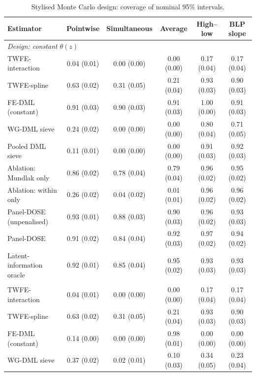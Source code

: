 \documentclass[preprint,12pt,authoryear]{elsarticle}
\begin{document}
\begin{table}[!ht]
\centering
\begin{threeparttable}
\caption{Stylised Monte Carlo design: coverage of nominal 95\% intervals.}\label{tab:simcover}
\scriptsize
\begin{tabular}{lccccc}
\toprule
Estimator & Pointwise & Simultaneous & Average & High--low & BLP slope\\
\midrule
\multicolumn{6}{l}{\textit{Design: constant $\theta(z)$}}\\
\quad TWFE-interaction & 0.04 (0.01) & 0.00 (0.00) & 0.00 (0.00) & 0.17 (0.04) & 0.17 (0.04)\\
\quad TWFE-spline & 0.63 (0.02) & 0.31 (0.05) & 0.21 (0.04) & 0.93 (0.03) & 0.90 (0.03)\\
\quad FE-DML (constant) & 0.91 (0.03) & 0.90 (0.03) & 0.91 (0.03) & 1.00 (0.00) & 0.91 (0.03)\\
\quad WG-DML sieve & 0.24 (0.02) & 0.00 (0.00) & 0.00 (0.00) & 0.80 (0.04) & 0.71 (0.05)\\
\quad Pooled DML sieve & 0.11 (0.01) & 0.00 (0.00) & 0.00 (0.00) & 0.91 (0.03) & 0.92 (0.03)\\
\quad Ablation: Mundlak only & 0.86 (0.02) & 0.78 (0.04) & 0.79 (0.04) & 0.96 (0.02) & 0.95 (0.02)\\
\quad Ablation: within only & 0.26 (0.02) & 0.04 (0.02) & 0.01 (0.01) & 0.96 (0.02) & 0.96 (0.02)\\
\quad Panel-DOSE (unpenalised) & 0.93 (0.01) & 0.88 (0.03) & 0.90 (0.03) & 0.96 (0.02) & 0.93 (0.03)\\
\quad Panel-DOSE & 0.91 (0.02) & 0.84 (0.04) & 0.92 (0.03) & 0.97 (0.02) & 0.94 (0.02)\\
\quad Latent-information oracle & 0.92 (0.01) & 0.85 (0.04) & 0.95 (0.02) & 0.93 (0.03) & 0.93 (0.03)\\
\addlinespace
\multicolumn{6}{l}{\textit{Design: linear $\theta(z)$}}\\
\quad TWFE-interaction & 0.04 (0.01) & 0.00 (0.00) & 0.00 (0.00) & 0.17 (0.04) & 0.17 (0.04)\\
\quad TWFE-spline & 0.63 (0.02) & 0.31 (0.05) & 0.21 (0.04) & 0.93 (0.03) & 0.90 (0.03)\\
\quad FE-DML (constant) & 0.14 (0.00) & 0.00 (0.00) & 0.98 (0.01) & 0.00 (0.00) & 0.00 (0.00)\\
\quad WG-DML sieve & 0.37 (0.02) & 0.02 (0.01) & 0.10 (0.03) & 0.34 (0.05) & 0.23 (0.04)\\

\end{tabular}
\end{threeparttable}
\end{table}
\end{document}
